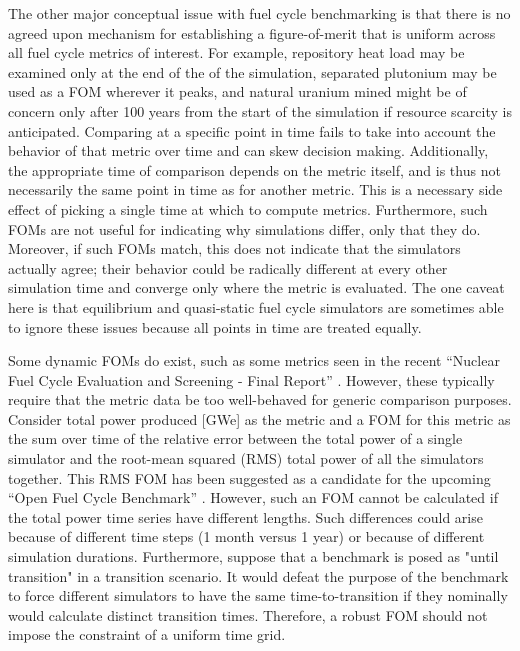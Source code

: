 The other major conceptual issue with fuel cycle benchmarking is that there 
is no agreed upon mechanism for establishing a figure-of-merit
that is uniform across all fuel cycle metrics of interest. For example, 
repository heat load may be examined only at the end of the of the simulation,
separated plutonium may be used as a FOM wherever it peaks, and natural uranium 
mined might be of concern only after 100 years from the start of the 
simulation if resource scarcity is anticipated. Comparing at a specific point 
in time fails to take into account the behavior of that metric over time and 
can skew decision making. Additionally, the appropriate 
time of comparison depends on the metric itself, and is thus not necessarily 
the same point in time as for another metric. This is a necessary 
side effect of picking a single time at which to compute metrics.
Furthermore, such FOMs are not useful for indicating why simulations differ, 
only that they do. Moreover, if such FOMs match, this does not indicate
that the simulators actually agree; their behavior 
could be radically different at every other simulation time and converge
only where the metric is evaluated.  The one caveat 
here is that 
equilibrium and quasi-static fuel cycle simulators are sometimes able to 
ignore these issues because all points in time are treated equally.

Some dynamic FOMs do exist, such as some metrics seen in the recent 
``Nuclear Fuel Cycle Evaluation and Screening - Final Report'' 
\cite{wigeland2014nuclear}. However, these typically require that the metric
data be too well-behaved for generic comparison purposes. Consider  
total power produced [GWe] as the metric and a FOM for this metric as 
the sum over time of the relative error 
between the total power of a single simulator and the root-mean squared (RMS)
total power of all the simulators together. This RMS FOM has been suggested as
a candidate for the upcoming ``Open Fuel Cycle Benchmark'' 
\cite{mouginot2015ofcb}. However, such an FOM cannot be calculated 
if the total power
time series have different lengths. Such differences could arise because 
of different time steps (1 month versus 1 year) or because of different 
simulation durations. Furthermore, suppose that a benchmark is posed as 
"until transition" in a transition scenario. It would defeat the purpose of 
the benchmark to force different simulators to have the same 
time-to-transition if they nominally would calculate distinct transition 
times. Therefore, a robust FOM should not impose the constraint of a uniform time grid.
 

